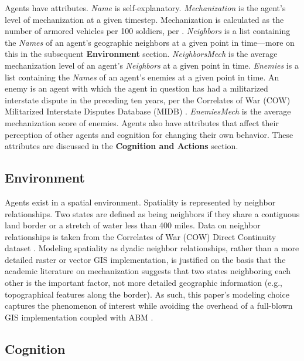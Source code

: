 \documentclass{article}
\begin{document}
Agents have attributes. \textit{Name} is self-explanatory.
\textit{Mechanization} is the agent's level of mechanization at a given
timestep. Mechanization is calculated as the number of armored vehicles per 100
soldiers, per \citet{sechser2010army}. \textit{Neighbors} is a list containing
the \textit{Names} of an agent's geographic neighbors at a given point in
time---more on this in the subsequent \textbf{Environment} section. \textit{NeighborsMech} is the
average mechanization level of an agent's \textit{Neighbors} at a given point in
time. \textit{Enemies} is a list containing the \textit{Names} of an agent's
enemies at a given point in time. An enemy is an agent with which the agent in
question has had a militarized interstate dispute in the preceding ten years,
per the Correlates of War (COW) Militarized Interstate Disputes Database (MIDB)
\citep{cow_midb}. \textit{EnemiesMech} is the average mechanization score of
enemies. Agents also have attributes that affect their
perception of other agents and cognition for changing their own behavior. These
attributes are discussed in the \textbf{Cognition and Actions} section.


\subsection{Environment}

Agents exist in a spatial environment. Spatiality is represented by neighbor
relationships. Two states are defined as
being neighbors if they share a contiguous land border or a stretch of water
less than 400 miles. Data on neighbor relationships is taken from the Correlates
of War (COW) Direct Continuity dataset \citep{cow_contiguity}.
Modeling spatiality as dyadic neighbor relationships, rather than a more
detailed raster or vector GIS implementation, is justified on the basis that the
academic literature on mechanization suggests that two states neighboring each
other is the important factor, not more detailed geographic information (e.g.,
topographical features along the border). As such, this paper's modeling choice
captures the phenomenon of interest while avoiding the overhead of a full-blown
GIS implementation coupled with ABM \citep[e.g.][]{harper2002modeling,bennett2006modelling}.

\subsection{Cognition}
\end{document}
